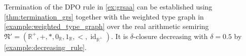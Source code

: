 \begin{example}
    \label{example:termination}
    Termination of the DPO rule in \autoref{ex:grsaa} can be established using \autoref{thm:termination_grs} together with the weighted type graph in \autoref{example:weighted_type_graph} over the real arithmetic semiring $\mathfrak{N}' = (\mathbb{R}^+,+,*,0_\mathbb{R},1_\mathbb{R},<,\operatorname{id}_{\mathbb{R}^+})$. It is $\delta$-closure decreasing with $\delta = 0.5$ by \autoref{example:decreasing_rule}.
\end{example}

